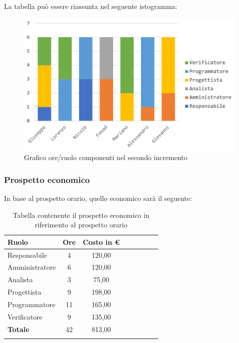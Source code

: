		La tabella può essere riassunta nel seguente istogramma:
		\begin{figure}[H]
			\centering
			\includegraphics[width=0.8\linewidth]{./images/preventivo/incremento2-1.png}
			\caption{Grafico ore/ruolo componenti nel secondo incremento}
			\label{fig:grafico suddivione ruoli incremento II}
		\end{figure}
		
		\subsubsection{Prospetto economico}
		In base al prospetto orario, quello economico sarà il seguente: 
		
		\begin{longtable}{|l|c|c|c|c|c|c|c|}
			\hline
			\rowcolor{lighter-grayer}
			\textbf{Ruolo} & \textbf{Ore} & \textbf{Costo in € } \\
			\hline
			\endfirsthead
			
			\hline
			Responsabile 	    & 4 & 120,00\\
			\hline 
			\hline
			Amministratore	   & 6 & 120,00\\
			\hline
			\hline
			Analista 				& 3 & 75,00\\
			\hline
			\hline
			Progettista 		   & 9 & 198,00\\
			\hline
			\hline
			Programmatore 	  & 11 & 165,00\\
			\hline
			\hline
			Verificatore 		   & 9 & 135,00\\
			\hline
			\textbf{Totale} 	 & 42 & 813,00\\
			\hline
			\caption{Tabella contenente il prospetto economico in riferimento al prospetto orario}
		\end{longtable}
		\pagebreak
		
